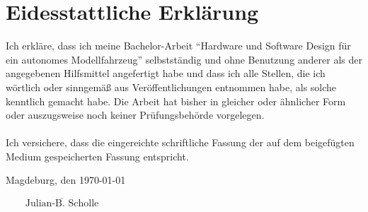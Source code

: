 \chapter*{Eidesstattliche Erklärung}
Ich erkläre, dass ich meine Bachelor-Arbeit ``Hardware und Software Design für ein autonomes Modellfahrzeug'' selbstständig und ohne Benutzung anderer als der angegebenen Hilfsmittel angefertigt habe und dass ich alle Stellen, die ich wörtlich oder sinngemäß aus Veröffentlichungen entnommen habe, als solche kenntlich gemacht habe. Die Arbeit hat bisher in gleicher oder ähnlicher Form oder auszugsweise noch keiner Prüfungsbehörde vorgelegen.\\\\

Ich versichere, dass die eingereichte schriftliche Fassung der auf dem beigefügten Medium gespeicherten Fassung entspricht.


\noindent Magdeburg, den \today
\begin{flushright}
$\overline{~~~~~~~~~\mbox{Julian-B. Scholle}~~~~~~~~~}$
\end{flushright}